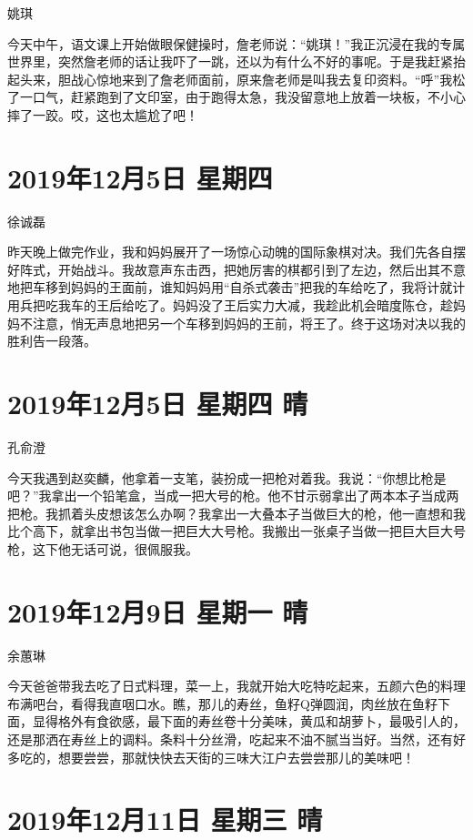 姚琪

今天中午，语文课上开始做眼保健操时，詹老师说：``姚琪！''我正沉浸在我的专属世界里，突然詹老师的话让我吓了一跳，还以为有什么不好的事呢。于是我赶紧抬起头来，胆战心惊地来到了詹老师面前，原来詹老师是叫我去复印资料。``呼''我松了一口气，赶紧跑到了文印室，由于跑得太急，我没留意地上放着一块板，不小心摔了一跤。哎，这也太尴尬了吧！

\section{2019年12月5日 星期四}

徐诚磊

昨天晚上做完作业，我和妈妈展开了一场惊心动魄的国际象棋对决。我们先各自摆好阵式，开始战斗。我故意声东击西，把她厉害的棋都引到了左边，然后出其不意地把车移到妈妈的王面前，谁知妈妈用``自杀式袭击''把我的车给吃了，我将计就计用兵把吃我车的王后给吃了。妈妈没了王后实力大减，我趁此机会暗度陈仓，趁妈妈不注意，悄无声息地把另一个车移到妈妈的王前，将王了。终于这场对决以我的胜利告一段落。

\section{2019年12月5日 星期四 晴}

孔俞澄

今天我遇到赵奕麟，他拿着一支笔，装扮成一把枪对着我。我说：``你想比枪是吧？''我拿出一个铅笔盒，当成一把大号的枪。他不甘示弱拿出了两本本子当成两把枪。我抓着头皮想该怎么办啊？我拿出一大叠本子当做巨大的枪，他一直想和我比个高下，就拿出书包当做一把巨大大号枪。我搬出一张桌子当做一把巨大巨大号枪，这下他无话可说，很佩服我。

\section{2019年12月9日 星期一 晴}

余蕙琳

今天爸爸带我去吃了日式料理，菜一上，我就开始大吃特吃起来，五颜六色的料理布满吧台，看得我直咽口水。瞧，那儿的寿丝，鱼籽Q弹圆润，肉丝放在鱼籽下面，显得格外有食欲感，最下面的寿丝卷十分美味，黄瓜和胡萝卜，最吸引人的，还是那洒在寿丝上的调料。条料十分丝滑，吃起来不油不腻当当好。当然，还有好多吃的，想要尝尝，那就快快去天街的三味大江户去尝尝那儿的美味吧！

\section{2019年12月11日 星期三 晴}

